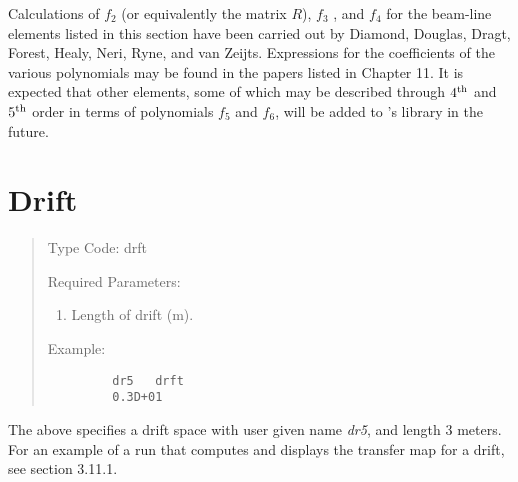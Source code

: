      Calculations of $f_2$  (or equivalently the matrix $R$), $f_3$ , and $f_4$  for the
beam-line elements listed in this section have been carried out by Diamond, Douglas,
Dragt, Forest, Healy, Neri, Ryne, and van Zeijts.  Expressions for the coefficients
of the various polynomials may be found in the papers listed in Chapter 11.  It is expected that other elements, some of which may
be described through $4^{\mbox{\scriptsize th}}$ and $5^{\mbox{\scriptsize th}}$ order in terms of polynomials $f_5$  and $f_6$,
will be added to \Maryend 's library in the future.

\newpage
\section{Drift}
\begin{quotation}
\noindent Type Code:  drft
\vspace{5mm}

\noindent Required Parameters:
\begin{enumerate}
     \item  Length of drift (m).
\end{enumerate}

\vspace{5mm}
\noindent    Example:
\begin{verbatim}
         dr5   drft
         0.3D+01
\end{verbatim}
\end{quotation}
The above specifies a drift space with user given name {\em dr5}, and length
3 meters.  For an example of a \Mary run that computes and displays the
transfer map for a drift, see section 3.11.1.

\newpage
